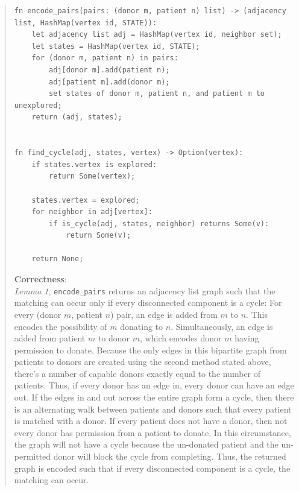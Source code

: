 \documentclass[11pt]{article}
\begin{document}
\begin{enumerate}
\begin{enumerate}
\begin{quote}
\begin{verbatim}
fn encode_pairs(pairs: (donor m, patient n) list) -> (adjacency list, HashMap(vertex id, STATE)):
    let adjacency list adj = HashMap(vertex id, neighbor set);
    let states = HashMap(vertex id, STATE);
    for (donor m, patient n) in pairs:
        adj[donor m].add(patient n);
        adj[patient m].add(donor m);
        set states of donor m, patient n, and patient m to unexplored;
    return (adj, states);


fn find_cycle(adj, states, vertex) -> Option(vertex):
    if states.vertex is explored:
        return Some(vertex);

    states.vertex = explored;
    for neighbor in adj[vertex]:
        if is_cycle(adj, states, neighbor) returns Some(v):
            return Some(v);

    return None;
  \end{verbatim}

  \textbf{Correctness}: \\ 
  \textit{Lemma 1}, \texttt{encode_pairs} returns an adjacency list graph such that the matching can occur only if every disconnected component is a cycle: For every (donor $m$, patient $n$) pair, an edge is added from $m$ to $n$. This encodes the possibility of $m$ donating to $n$. Simultaneously, an edge is added from patient $m$ to donor $m$, which encodes donor $m$ having permission to donate. Because the only edges in this bipartite graph from patients to donors are created using the second method stated above, there's a number of capable donors exactly equal to the number of patients. Thus, if every donor has an edge in, every donor can have an edge out. If the edges in and out across the entire graph form a cycle, then there is an alternating walk between patients and donors such that every patient is matched with a donor. If every patient does not have a donor, then not every donor has permission from a patient to donate. In this circumstance, the graph will not have a cycle because the un-donated patient and the un-permitted donor will block the cycle from completing. Thus, the returned graph is encoded such that if every disconnected component is a cycle, the matching can occur.  


\end{quote}
\end{enumerate}
\end{enumerate}
\end{document}
